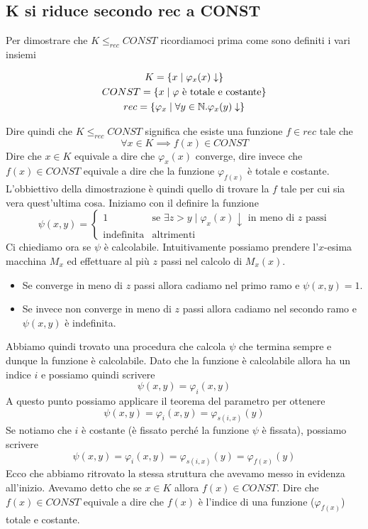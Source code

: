 \subsection{K si riduce secondo rec a CONST}

Per dimostrare che $K \leq_{rec} CONST$ ricordiamoci prima come
sono definiti i vari insiemi

\begin{gather*}
	K = \{ x \mid \varphi_x (x) \downarrow \} \\
	CONST = \{ x \mid \varphi \text{ è totale e costante} \} \\
	rec = \{ \varphi_x \mid \forall y \in \mathbb{N} . \varphi_x (y) \downarrow \}
\end{gather*}

Dire quindi che $K \leq_{rec} CONST$ significa che esiste una funzione
$f \in rec$ tale che
\[ \forall x \in K \implies f(x) \in CONST \]
Dire che $x \in K$ equivale a dire che $\varphi_x (x)$ converge,
dire invece che $f(x) \in CONST$ equivale a dire che la funzione
$\varphi_{f(x)}$ è totale e costante. L'obbiettivo della
dimostrazione è quindi quello di trovare la $f$ tale per cui sia
vera quest'ultima cosa. Iniziamo con il definire la funzione
\[
	\psi (x, y) = \begin{cases}
		1                 & \text{se } \exists z > y \mid
		\varphi_x(x) \downarrow \text{ in meno di $z$ passi} \\
		\text{indefinita} & \text{altrimenti}
	\end{cases}
\]
Ci chiediamo ora se $\psi$ è calcolabile. Intuitivamente possiamo
prendere l'$x$-esima macchina $M_x$ ed effettuare al più $z$
passi nel calcolo di $M_x(x)$.
\begin{itemize}
	\item Se converge in meno di $z$ passi allora cadiamo nel
	      primo ramo e $\psi(x, y) = 1$.
	\item Se invece non converge in meno di $z$ passi allora
	      cadiamo nel secondo ramo e $\psi(x,y)$ è indefinita.
\end{itemize}
Abbiamo quindi trovato una procedura che calcola $\psi$ che
termina sempre e dunque la funzione è calcolabile. Dato che la
funzione è calcolabile allora ha un indice $i$ e possiamo quindi
scrivere
\[ \psi(x, y) = \varphi_i (x, y) \]
A questo punto possiamo applicare il teorema del parametro per
ottenere
\[ \psi(x, y) = \varphi_i (x, y) = \varphi_{s(i,x)} (y) \]
Se notiamo che $i$ è costante (è fissato perché la funzione
$\psi$ è fissata), possiamo scrivere
\[
	\psi(x, y) = \varphi_i (x, y) =
	\varphi_{s(i,x)} (y) = \varphi_{f(x)} (y)
\]
Ecco che abbiamo ritrovato la stessa struttura che avevamo messo
in evidenza all'inizio. Avevamo detto che se $x \in K$ allora
$f(x) \in CONST$. Dire che $f(x) \in CONST$ equivale a dire che
$f(x)$ è l'indice di una funzione ($\varphi_{f(x)}$) totale e
costante.

